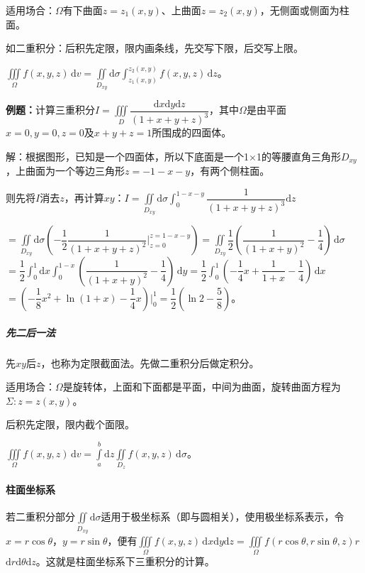 \documentclass[UTF8, 12pt]{ctexart}
\begin{document}
适用场合：$\Omega$有下曲面$z=z_1(x,y)$、上曲面$z=z_2(x,y)$，无侧面或侧面为柱面。

如二重积分：后积先定限，限内画条线，先交写下限，后交写上限。

$\iiint\limits_\Omega f(x,y,z)\,\textrm{d}v=\iint\limits_{D_{xy}}\textrm{d}\sigma\int_{z_1(x,y)}^{z_2(x,y)}f(x,y,z)\,\textrm{d}z$。

\textbf{例题：}计算三重积分$I=\displaystyle{\iiint\limits_D\dfrac{\textrm{d}x\textrm{d}y\textrm{d}z}{(1+x+y+z)^3}}$，其中$\Omega$是由平面$x=0,y=0,z=0$及$x+y+z=1$所围成的四面体。

解：根据图形，已知是一个四面体，所以下底面是一个1×1的等腰直角三角形$D_{xy}$，上曲面为一个等边三角形$z=-1-x-y$，有两个侧柱面。

则先将$I$消去$z$，再计算$xy$：$I=\displaystyle{\iint\limits_{D_{xy}}\textrm{d}\sigma\int_0^{1-x-y}\dfrac{1}{(1+x+y+z)^3}\textrm{d}z}$

$=\displaystyle{\iint\limits_{D_{xy}}\textrm{d}\sigma\left(-\dfrac{1}{2}\dfrac{1}{(1+x+y+z)^2}\bigg|_{z=0}^{z=1-x-y}\right)}=\displaystyle{\iint\limits_{D_{xy}}\dfrac{1}{2}\left(\dfrac{1}{(1+x+y)^2}-\dfrac{1}{4}\right)\,\textrm{d}\sigma}$\\$=\dfrac{1}{2}\int_0^1\textrm{d}x\int_0^{1-x}\left(\dfrac{1}{(1+x+y)^2}-\dfrac{1}{4}\right)\,\textrm{d}y=\dfrac{1}{2}\displaystyle{\int_0^1\left(-\dfrac{1}{4}x+\dfrac{1}{1+x}-\dfrac{1}{4}\right)\,\textrm{d}x}$\\$=\left(-\dfrac{1}{8}x^2+\ln(1+x)-\dfrac{1}{4}x\right)\bigg|_0^1=\dfrac{1}{2}\left(\ln2-\dfrac{5}{8}\right)$。

\subparagraph{先二后一法} \leavevmode \medskip

先$xy$后$z$，也称为定限截面法。先做二重积分后做定积分。

适用场合：$\Omega$是旋转体，上面和下面都是平面，中间为曲面，旋转曲面方程为$\Sigma:z=z(x,y)$。

后积先定限，限内截个面限。

$\iiint\limits_\Omega f(x,y,z)\,\textrm{d}v=\int\limits_a^b\textrm{d}z\iint\limits_{D_z}f(x,y,z)\,\textrm{d}\sigma$。

\paragraph{柱面坐标系} \leavevmode \medskip

若二重积分部分$\iint\limits_{D_{xy}}\textrm{d}\sigma$适用于极坐标系（即与圆相关），使用极坐标系表示，令$x=r\cos\theta$，$y=r\sin\theta$，便有$\iiint\limits_\Omega f(x,y,z)\,\textrm{d}x\textrm{d}y\textrm{d}z=\iiint\limits_\Omega f(r\cos\theta,r\sin\theta,z)r\,$\\$\textrm{d}r\textrm{d}\theta\textrm{d}z$。这就是柱面坐标系下三重积分的计算。
\end{document}
